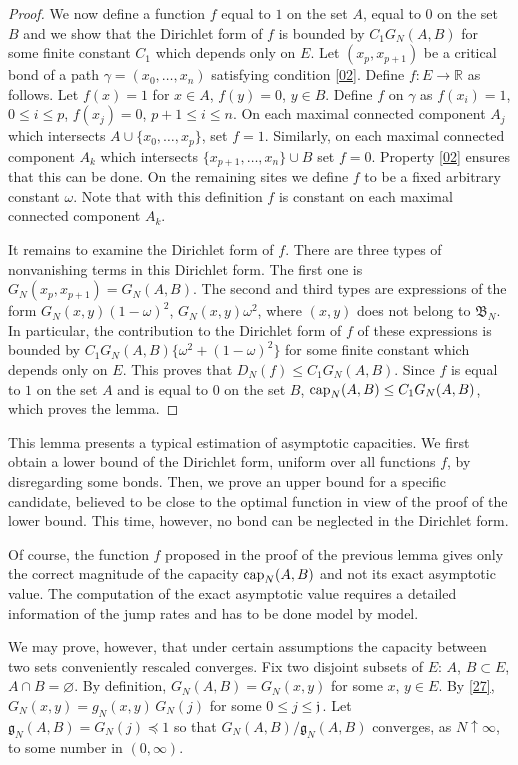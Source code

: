 \documentclass[reqno]{amsart}
\begin{document}
\begin{proof}
We now define a function $f$ equal to $1$ on the set $A$, equal to $0$
on the set $B$ and we show that the Dirichlet form of $f$ is bounded
by $C_1 G_N(A,B)$ for some finite constant $C_1$ which depends only on
$E$. Let $(x_p,x_{p+1})$ be a critical bond of a path $\gamma =(x_0,
\dots, x_n)$ satisfying condition \eqref{02}. Define $f:E\to {{\mathbb R}}$ as
follows. Let $f(x)=1$ for $x\in A$, $f(y)=0$, $y\in B$. Define $f$ on
$\gamma$ as $f(x_i)=1$, $0\le i\le p$, $f(x_j)=0$, $p+1\le i\le n$. On
each maximal connected component $A_j$ which intersects $A\cup \{x_0,
\dots, x_p\}$, set $f=1$. Similarly, on each maximal connected
component $A_k$ which intersects $\{x_{p+1}, \dots, x_n\} \cup B$ set
$f=0$. Property \eqref{02} ensures that this can be done. On the
remaining sites we define $f$ to be a fixed arbitrary constant
$\omega$. Note that with this definition $f$ is constant on each
maximal connected component $A_k$.

It remains to examine the Dirichlet form of $f$. There are three types
of nonvanishing terms in this Dirichlet form. The first one is
$G_N(x_p,x_{p+1}) = G_N(A,B)$. The second and third types are
expressions of the form $G_N(x,y) (1-\omega)^2$, $G_N(x,y) \omega^2$,
where $(x,y)$ does not belong to ${{\mathfrak B}}_N$. In particular, the
contribution to the Dirichlet form of $f$ of these expressions is
bounded by $C_1 G_N(A,B) \{\omega^2 + (1-\omega)^2\}$ for some finite
constant which depends only on $E$. This proves that $D_N(f) \le C_1
G_N(A,B)$. Since $f$ is equal to $1$ on the set $A$ and is equal to
$0$ on the set $B$, ${{\rm cap}}_N(A,B) \le C_1 G_N(A,B)$, which proves the
lemma.
\end{proof}

This lemma presents a typical estimation of asymptotic capacities. We
first obtain a lower bound of the Dirichlet form, uniform over all
functions $f$, by disregarding some bonds. Then, we prove an upper
bound for a specific candidate, believed to be close to the optimal
function in view of the proof of the lower bound. This time, however,
no bond can be neglected in the Dirichlet form.

Of course, the function $f$ proposed in the proof of the previous
lemma gives only the correct magnitude of the capacity ${{\rm cap}}_N(A,B)$ and
not its exact asymptotic value. The computation of the exact
asymptotic value requires a detailed information of the jump rates and
has to be done model by model.

We may prove, however, that under certain assumptions the capacity
between two sets conveniently rescaled converges. Fix two disjoint
subsets of $E$: $A$, $B\subset E$, $A\cap B=\varnothing$. By
definition, $G_N(A,B) = G_N(x,y)$ for some $x$, $y\in E$. By
\eqref{27}, $G_N(x,y) =g_N(x,y) \, G_N(j)$ for some $0\le j \le {{\mathfrak j}}\, $. Let ${{\mathfrak g}}_N(A,B) = G_N(j) \preceq 1$ so that $G_N(A,B)/ {{\mathfrak g}}_N(A,B)$ converges, as $N\uparrow\infty$, to some number in
$(0,\infty)$.
\end{document}
